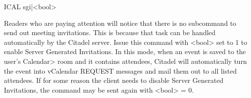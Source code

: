  ICAL sgi|<bool>

 Readers who are paying attention will notice that there is no subcommand to
send out meeting invitations.  This is because that task can be handled
automatically by the Citadel server.  Issue this command with <bool> set to 1
to enable Server Generated Invitations.  In this mode, when an event is saved
to the user's Calendar> room and it contains attendees, Citadel will
automatically turn the event into vCalendar REQUEST messages and mail them
out to all listed attendees.  If for some reason the client needs to disable
Server Generated Invitations, the command may be sent again with <bool> = 0.
